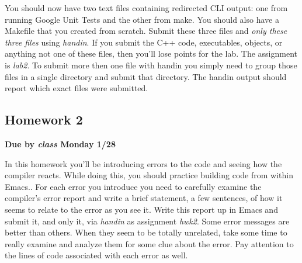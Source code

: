 \documentclass[nobib]{tufte-handout}
\begin{document}
You should now have two text files containing redirected CLI output: one from running Google Unit Tests and the other from make. You should also have a Makefile that you created from scratch. Submit these three files and \textit{only these three files} using \textit{handin}. If you submit the C++ code, executables, objects, or anything not one of these files, then you'll lose points for the lab. The assignment is \textit{lab2}. To submit more then one file with handin you simply need to group those files in a single directory and submit that directory. The handin output should report which exact files were submitted.

\subsection{Homework 2}

\begin{center}
\textbf{Due by \textit{class} Monday 1/28}
\end{center}

In this homework you'll be introducing errors to the code and seeing how the compiler reacts. While doing this, you should practice building code from within Emacs.. For each error you introduce you need to carefully examine the compiler's error report and write a brief statement, a few sentences, of how it seems to relate to the error as you see it.  Write this report up in Emacs and submit it, and only it, via \textit{handin} as assignment \textit{hwk2}.  Some error messages are better than others. When they seem to be totally unrelated, take some time to really examine and analyze them for some clue about the error.  Pay attention to the lines of code associated with each error as well.
\end{document}
